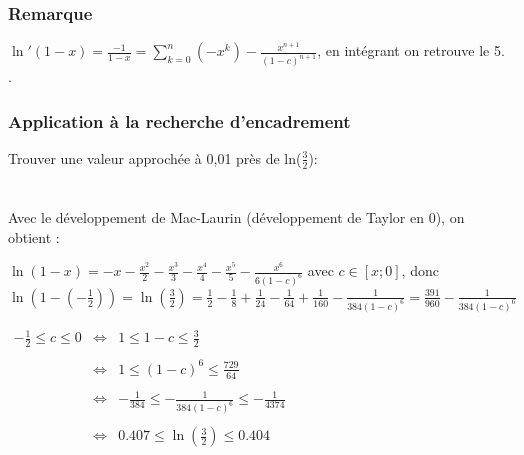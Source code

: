 \documentclass[a4paper,10pt]{book} %
\begin{document}
\subsubsection{Remarque}
$\ln'(1-x)=\frac{-1}{1-x}=\sum\limits_{k=0}^n (-x^k)-\frac{x^{n+1}}{(1-c)^{n+1}}$, en intégrant on retrouve le 5. .

\newpage

\subsubsection{Application à la recherche d'encadrement}
Trouver une valeur approchée à 0,01 près de ln($\frac{3}{2}$):\\\\\\
Avec le développement de Mac-Laurin (développement de Taylor en 0), on obtient :\\ \begin{center}$\ln(1-x)=-x-\frac{x^2}{2}-\frac{x^3}{3}-\frac{x^4}{4}-\frac{x^5}{5}-\frac{x^6}{6(1-c)^6}$ avec $c \in [x;0]$, donc\\\bigskip
$\ln(1-(-\frac{1}{2}))=\ln(\frac{3}{2})=\frac{1}{2}-\frac{1}{8}+\frac{1}{24}-\frac{1}{64}+\frac{1}{160}-\frac{1}{384(1-c)^6}=\frac{391}{960}-\frac{1}{384(1-c)^6}$\bigskip\end{center}

\begin{center}$\begin{array}{rcl} -\frac{1}{2}\leq c\leq 0 &\Leftrightarrow& 1\leq 1-c\leq \frac{3}{2}\\\\
&\Leftrightarrow& 1\leq (1-c)^6 \leq \frac{729}{64}\\\\
&\Leftrightarrow& -\frac{1}{384}\leq -\frac{1}{384(1-c)^6}\leq -\frac{1}{4374}\\\\
&\Leftrightarrow& 0.407\leq \ln(\frac{3}{2})\leq 0.404\end{array}$ \end{center}





\end{document}

